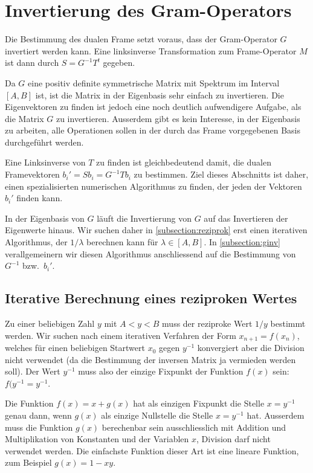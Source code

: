 %
%
%
\section{Invertierung des Gram-Operators\label{section:ginv}}
Die Bestimmung des dualen Frame setzt voraus, dass der Gram-Operator
$G$ invertiert werden kann.
Eine linksinverse Transformation zum Frame-Operator $M$ ist dann durch
$S=G^{-1}T^t$ gegeben.

Da $G$ eine positiv definite symmetrische Matrix mit Spektrum im
Interval $[A,B]$ ist, ist die Matrix in der Eigenbasis sehr einfach
zu invertieren.
Die Eigenvektoren zu finden ist jedoch eine noch deutlich aufwendigere
Aufgabe, als die Matrix $G$ zu invertieren.
Ausserdem gibt es kein Interesse, in der Eigenbasis zu arbeiten, alle
Operationen sollen in der durch das Frame vorgegebenen Basis durchgeführt
werden.

Eine Linksinverse von $T$ zu finden ist gleichbedeutend damit,
die dualen Framevektoren $b_i' = Sb_i = G^{-1}Tb_i$ zu bestimmen.
Ziel dieses Abschnitts ist daher, einen spezialisierten numerischen
Algorithmus zu finden, der jeden der Vektoren $b_i'$ finden kann.

In der Eigenbasis von $G$ läuft die Invertierung von $G$ auf
das Invertieren der Eigenwerte hinaus.
Wir suchen daher in \ref{subsection:reziprok} erst einen iterativen
Algorithmus, der $1/\lambda$ berechnen kann für $\lambda\in[A,B]$.
In \ref{subsection:ginv} verallgemeinern wir diesen Algorithmus
anschliessend auf die Bestimmung von $G^{-1}$ bzw.~$b_i'$.

\subsection{Iterative Berechnung eines reziproken Wertes
\label{subsection:reziprok}}
Zu einer beliebigen Zahl $y$ mit $A < y < B$ muss der reziproke Wert $1/y$
bestimmt werden.
Wir suchen nach einem iterativen Verfahren der Form $x_{n+1}=f(x_n)$,
welches für einen beliebigen Startwert $x_0$ gegen $y^{-1}$ konvergiert
aber die Division nicht verwendet (da die Bestimmung der inversen
Matrix ja vermieden werden soll).
Der Wert $y^{-1}$ muss also der einzige Fixpunkt der Funktion $f(x)$ sein:
$f(y^{-1}=y^{-1}$.

Die Funktion $f(x) = x + g(x)$ hat als einzigen Fixpunkt die Stelle $x=y^{-1}$
genau dann, wenn $g(x)$ als einzige Nullstelle die Stelle $x=y^{-1}$ hat.
Ausserdem muss die Funktion $g(x)$ berechenbar sein ausschliesslich mit
Addition und Multiplikation von Konstanten und der Variablen $x$, Division
darf nicht verwendet werden.
Die einfachste Funktion dieser Art ist eine lineare Funktion, zum 
Beispiel $g(x) = 1- xy$.


